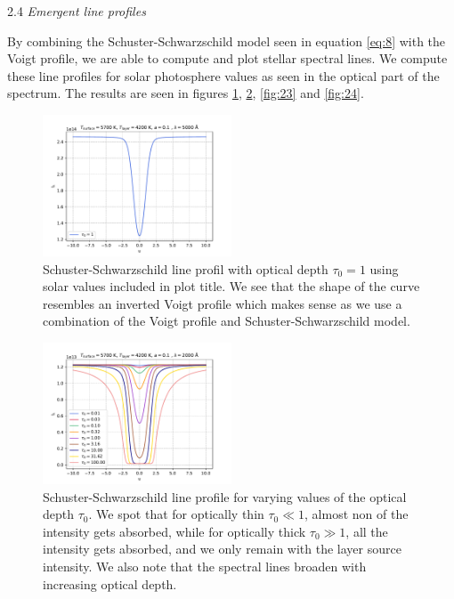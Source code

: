 \documentclass[a4paper,11.5pt,]{article}
\begin{document}
\begin{multicols}{2}
\begin{center}
2.4\textit{ Emergent line profiles}
\end{center}

By combining the Schuster-Schwarzschild model seen in equation \eqref{eq:8} with the Voigt profile, we are able to compute and plot stellar spectral lines. We compute these line profiles for solar photosphere values as seen in the optical part of the spectrum. The results are seen in figures \ref{fig:21}, \ref{fig:22}, \ref{fig:23} and \ref{fig:24}.
\begin{figure}[H]
	\centering
	\includegraphics[width=0.5\textwidth]{SSA/figures/ssline.pdf}
	\caption{Schuster-Schwarzschild line profil with optical depth $\tau_0 = 1$ using solar values included in plot title. We see that the shape of the curve resembles an inverted Voigt profile which makes sense as we use a combination of the Voigt profile and Schuster-Schwarzschild model.}
	\label{fig:21}
\end{figure}


\begin{figure}[H]
	\centering
	\includegraphics[width=0.5\textwidth]{SSA/figures/ss0.pdf}
	\caption{Schuster-Schwarzschild line profile for varying values of the optical depth $\tau_0$. We spot that for optically thin $\tau_0 \ll 1$, almost non of the intensity gets absorbed, while for optically thick $\tau_0 \gg 1$, all the intensity gets absorbed, and we only remain with the layer source intensity. We also note that the spectral lines broaden with increasing optical depth. }
	\label{fig:22}
\end{figure}



\end{multicols}
\end{document}
